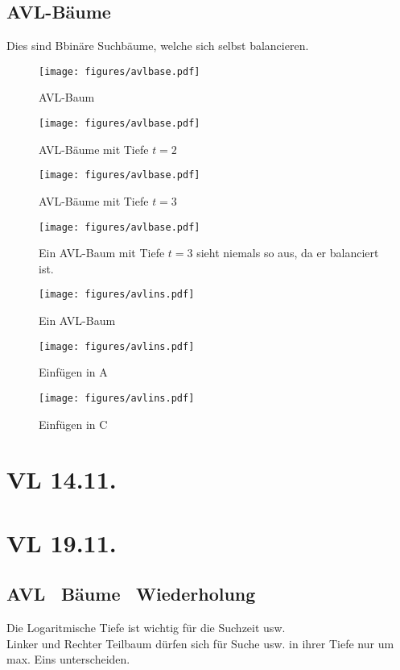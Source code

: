 \documentclass[a4paper,draft,twoside,10pt]{report}
\begin{document}
\section{AVL-Bäume}
Dies sind Bbinäre Suchbäume, welche sich selbst balancieren.
\begin{figure}[H]\center
\texttt{[image: figures/avlbase.pdf]}
\caption{AVL-Baum}
\end{figure}
\begin{figure}[H]\center
\texttt{[image: figures/avlbase.pdf]}
\caption{AVL-Bäume mit Tiefe $t=2$}
\end{figure}
\begin{figure}[H]\center
\texttt{[image: figures/avlbase.pdf]}
\caption{AVL-Bäume mit Tiefe $t=3$}
\end{figure}
\begin{figure}[H]\center
\texttt{[image: figures/avlbase.pdf]}
\caption{Ein AVL-Baum mit Tiefe $t=3$ sieht niemals so aus, da er balanciert ist.}
\end{figure}
\begin{figure}[H]\center
\texttt{[image: figures/avlins.pdf]}
\caption{Ein AVL-Baum}
\end{figure}
\begin{figure}[H]\center
\texttt{[image: figures/avlins.pdf]}
\caption{Einfügen in A}
\end{figure}
\begin{figure}[H]\center
\texttt{[image: figures/avlins.pdf]}
\caption{Einfügen in C}
\end{figure}
\chapter{VL 14.11.}

\chapter{VL 19.11.}
\section{AVL \, Bäume \, Wiederholung}

Die Logaritmische Tiefe ist wichtig für die Suchzeit usw.\\
Linker und Rechter Teilbaum dürfen sich für Suche usw. in ihrer Tiefe nur um max. Eins unterscheiden.
\end{document}
